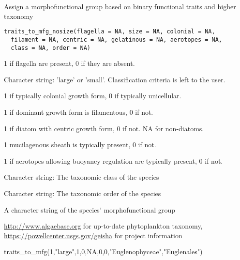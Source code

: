 \documentclass[a4paper]{book}
\begin{document}
%
\begin{Description}\relax
Assign a morphofunctional group based on binary functional traits and higher taxonomy
\end{Description}
%
\begin{Usage}
\begin{verbatim}
traits_to_mfg_nosize(flagella = NA, size = NA, colonial = NA,
  filament = NA, centric = NA, gelatinous = NA, aerotopes = NA,
  class = NA, order = NA)
\end{verbatim}
\end{Usage}
%
\begin{Arguments}
\begin{ldescription}
\item[\code{flagella}] 1 if flagella are present, 0 if they are absent.

\item[\code{size}] Character string: 'large' or 'small'. Classification criteria is left to the user.

\item[\code{colonial}] 1 if typically colonial growth form, 0 if typically unicellular.

\item[\code{filament}] 1 if dominant growth form is filamentous, 0 if not.

\item[\code{centric}] 1 if diatom with centric growth form, 0 if not. NA for  non-diatoms.

\item[\code{gelatinous}] 1 mucilagenous sheath is typically present, 0 if not.

\item[\code{aerotopes}] 1 if aerotopes allowing buoyancy regulation are typically present, 0 if not.

\item[\code{class}] Character string: The taxonomic class of the species

\item[\code{order}] Character string: The taxonomic order of the species
\end{ldescription}
\end{Arguments}
%
\begin{Value}
A character string of the species' morphofunctional group
\end{Value}
%
\begin{SeeAlso}\relax
\url{http://www.algaebase.org} for up-to-date phytoplankton taxonomy,
\url{https://powellcenter.usgs.gov/geisha} for project information
\end{SeeAlso}
%
\begin{Examples}
\begin{ExampleCode}
traits_to_mfg(1,"large",1,0,NA,0,0,"Euglenophyceae","Euglenales")

\end{ExampleCode}
\end{Examples}
\printindex{}
\end{document}
